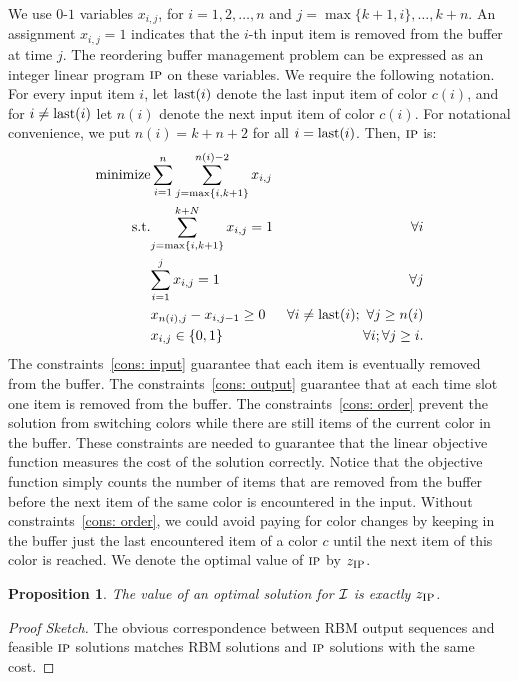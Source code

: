 \documentclass[11pt]{article}
\newtheorem{proposition}[theorem]{Proposition}
\newenvironment{proofsketch}{\begin{proof}[Proof Sketch]}{\end{proof}}
\newcommand{\IP}{{\hbox{\sc ip}}}
\newcommand{\last}{{\hbox{last}}}
\begin{document}
We use $0$-$1$ variables $x_{i,j}$, for $i=1,2,\dots,n$ and
$j=\max\{k+1,i\},\dots,k+n$.
An assignment $x_{i,j} = 1$ indicates that the $i$-th input item is
removed from the buffer at time $j$. The reordering buffer management
problem can be expressed as an integer linear program $\IP$ on these
variables. We require the following notation. For every input item $i$,
let $\last(i)$ denote the last input item of color $c(i)$, and for $i\ne\last(i)$
let $n(i)$ denote the next input item of color $c(i)$. For notational
convenience, we put $n(i) = k + n + 2$ for all $i=\last(i)$.
Then, $\IP$ is:
\begin{eqnarray}
\nonumber
\hbox{minimize}  & \sum_{i=1}^n\sum_{j=\max\{i,k+1\}}^{n(i)-2} x_{i,j} & \\
\label{cons: input}
\hbox{s.t.} &\displaystyle{\sum_{j=\max\{i,k+1\}}^{k+N}x_{i,j} = 1} & \forall i\\
\label{cons: output}
                 &\displaystyle{\sum_{i=1}^{j}x_{i,j} = 1}          & \forall j\\
\label{cons: order}
                 &x_{n(i),j}-x_{i,j-1}\geq 0                                 & \forall i\neq \last(i);\ \forall j\geq n(i)\\
\label{cons: int}
                 & x_{i,j}\in \{0,1\}                                            & \forall i;  \forall j\geq i.
\end{eqnarray}
The constraints~\eqref{cons: input} guarantee that each item is eventually
removed from the buffer. The constraints~\eqref{cons: output} guarantee
that at each time slot one item is removed from the buffer.
The constraints~\eqref{cons: order} prevent the solution from switching
colors while there are still items of the current color in the buffer. These
constraints are needed to guarantee that the linear objective function
measures the cost of the solution correctly. Notice that the objective function
simply counts the number of items that are removed from the buffer before
the next item of the same color is encountered in the input. Without
constraints~\eqref{cons: order}, we could avoid paying for color changes
by keeping in the buffer just the last encountered item of a color $c$ until
the next item of this color is reached. We denote the optimal value of
$\IP$ by $z_{\IP}$.
\begin{proposition}\label{pr: IP = RBM}
The value of an optimal solution for ${\cal I}$ is exactly $z_{\IP}$.
\end{proposition}

\begin{proofsketch}
The obvious correspondence between RBM output sequences and feasible
$\IP$ solutions matches RBM solutions and $\IP$ solutions with the same
cost.
\end{proofsketch}
\end{document}
